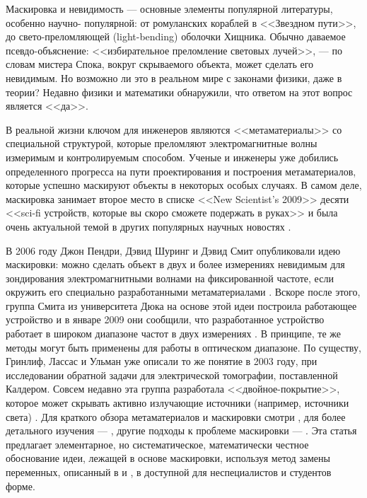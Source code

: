 \documentclass[a4paper, 12pt]{article}
\begin{document}
Маскировка и невидимость --- основные элементы популярной литературы, особенно научно-
популярной: от
ромуланских кораблей в <<Звездном пути>>, до свето-преломляющей (light-bending) 
оболочки Хищника. Обычно
даваемое псевдо-объяснение: <<избирательное преломление световых лучей>>, --- по 
словам мистера Спока,
вокруг скрываемого объекта, может сделать его невидимым. Но возможно ли это в реальном 
мире с законами
физики, даже в теории? Недавно физики и математики обнаружили, что ответом на этот 
вопрос является
<<да>>.


В реальной жизни ключом для инженеров являются <<метаматериалы>> со специальной 
структурой, которые
преломляют электромагнитные волны измеримым и контролируемым способом. Ученые и 
инженеры уже добились
определенного прогресса на пути проектирования и построения метаматериалов, которые 
успешно маскируют
объекты в некоторых особых случаях. В самом деле, маскировка занимает второе место в 
списке <<New
Scientist's 2009>> десяти <<sci-fi устройств, которые вы скоро сможете подержать в 
руках>> \cite{22} и
была очень актуальной темой в других популярных научных новостях \cite{10, 25}.

В 2006 году Джон Пендри, Дэвид Шуринг и Дэвид Смит опубликовали идею маскировки: можно 
сделать объект в двух
и более измерениях невидимым для зондирования электромагнитными волнами на 
фиксированной частоте, если
окружить его специально разработанными метаматериалами \cite{24}. Вскоре после этого, 
группа Смита из
университета Дюка на основе этой идеи построила работающее устройство 
\cite{26} и в январе 2009 они сообщили, что
разработанное устройство работает в широком диапазоне частот в двух измерениях 
\cite{18}. В принципе, те же
методы могут быть применены для работы в оптическом диапазоне. По существу, Гринлиф, 
Лассас и Ульман \cite{6} уже
описали то же понятие в 2003 году, при исследовании обратной задачи для электрической 
томографии,
поставленной Калдером. Совсем недавно эта группа разработала <<двойное-покрытие>>, 
которое может скрывать
активно излучающие источники (например, источники света) \cite{7}. Для краткого обзора 
метаматериалов и
маскировки смотри \cite{14}, для более детального изучения --- \cite{8, 9}, другие 
подходы к проблеме маскировки --- \cite{1, 13, 15, 16, 17, 18, 19, 20, 21, 28, 29}. 
Эта статья предлагает элементарное, но  систематическое,
математически честное обоснование идеи, лежащей в основе маскировки, используя метод 
замены переменных,
описанный в \cite{6} и \cite{13}, в доступной для неспециалистов и студентов форме.
\end{document}
